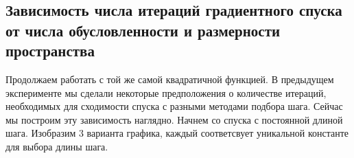 \documentclass{article}
\begin{document}
	\vspace{2cm}
	\subsection{Зависимость числа итераций градиентного спуска от числа обусловленности и размерности пространства}
	
	Продолжаем работать с той же самой квадратичной функцией. В предыдущем эксперименте мы сделали некоторые предположения о количестве итераций, необходимых для сходимости спуска с разными методами подбора шага. Сейчас мы построим эту зависимость наглядно. Начнем со спуска с постоянной длиной шага. Изобразим 3 варианта графика, каждый соответсвует уникальной константе для выбора длины шага.
	
	\newpage
	
	\begin{figure}[H]
		\centering
		\hfill %
		\\ %

\end{figure}
\end{document}
